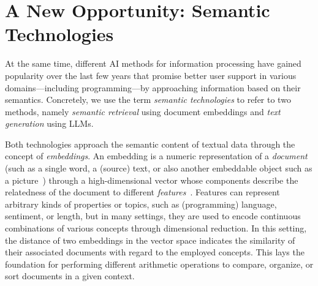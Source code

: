 
\section{A New Opportunity: Semantic Technologies}
\label{sec:background/semtec}

At the same time, different AI methods for information processing have gained popularity over the last few years that promise better user support in various domains---including programming---by approaching information based on their semantics.
Concretely, we use the term \emph{semantic technologies} to refer to two methods, namely \emph{semantic retrieval} using document embeddings and \emph{text generation} using LLMs.

Both technologies approach the semantic content of textual data through the concept of \emph{embeddings}.
An embedding is a numeric representation of a \emph{document} (such as a single word, a (source) text, or also another embeddable object such as a picture~\cite{dosovitskiy2021image}) through a high-dimensional vector whose components describe the relatedness of the document to different \emph{features}~\cite{mikolov2013efficient,devlin2019bert}.
Features can represent arbitrary kinds of properties or topics, such as (programming) language, sentiment, or length, but in many settings, they are used to encode continuous combinations of various concepts through dimensional reduction.
In this setting, the distance of two embeddings in the vector space indicates the similarity of their associated documents with regard to the employed concepts.
This lays the foundation for performing different arithmetic operations to compare, organize, or sort documents in a given context.

